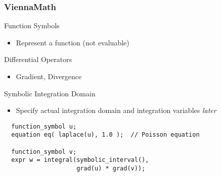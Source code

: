 \begin{frame}[fragile]
\frametitle{ViennaMath}

 \begin{block}{Function Symbols}
   \begin{itemize}
    \item Represent a function (not evaluable)
   \end{itemize}
 \end{block}

 \begin{block}{Differential Operators}
   \begin{itemize}
    \item Gradient, Divergence
   \end{itemize}
 \end{block}

 \begin{block}{Symbolic Integration Domain}
   \begin{itemize}
    \item Specify actual integration domain and integration variables \emph{later}
   \end{itemize}
 \end{block}
 
\begin{lstlisting}
  function_symbol u;
  equation eq( laplace(u), 1.0 );  // Poisson equation
  
  function_symbol v;
  expr w = integral(symbolic_interval(),
                    grad(u) * grad(v));
\end{lstlisting} 
 
\end{frame}





